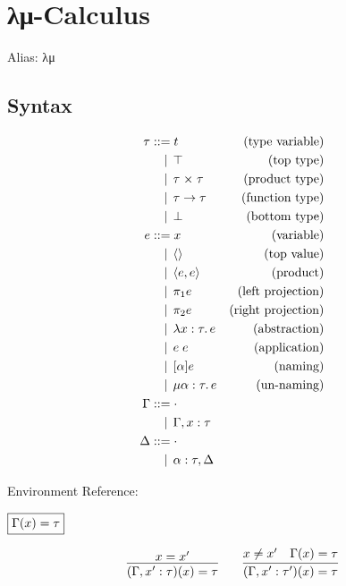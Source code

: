 \section{λμ-Calculus}

Alias: λμ \cite{Selinger:2001}\cite{Rocheteau:2005}

\subsection{Syntax}

\begin{align*}
  \tau
  &\BNFassign t &(\text{type variable}) \\
  &\BNFor \top &(\text{top type}) \\
  &\BNFor \tau \multi \tau &(\text{product type}) \\
  &\BNFor \tau \to \tau &(\text{function type}) \\
  &\BNFor \bot &(\text{bottom type}) \\
  e
  &\BNFassign x &(\text{variable}) \\
  &\BNFor \langle\rangle &(\text{top value}) \\
  &\BNFor \langle e, e\rangle &(\text{product}) \\
  &\BNFor \pi_1 e &(\text{left projection}) \\
  &\BNFor \pi_2 e &(\text{right projection}) \\
  &\BNFor \lambda x: \tau\ldotp e &(\text{abstraction}) \\
  &\BNFor e\; e &(\text{application}) \\
  &\BNFor [\alpha] e &(\text{naming}) \\
  &\BNFor \mu \alpha: \tau\ldotp e &(\text{un-naming}) \\
  \Gamma
  &\BNFassign \cdot \\
  &\BNFor \Gamma, x: \tau \\
  \Delta
  &\BNFassign \cdot \\
  &\BNFor \alpha: \tau, \Delta
\end{align*}

Environment Reference:

$\fbox{$\Gamma(x) = \tau$}$

\begin{gather*}
  \infer{(\Gamma, x': \tau)(x) = \tau}{
    x = x'
  }
  \hspace{2em}
  \infer{(\Gamma, x': \tau')(x) = \tau}{
    x \neq x'
    &
    \Gamma(x) = \tau
  }
\end{gather*}

